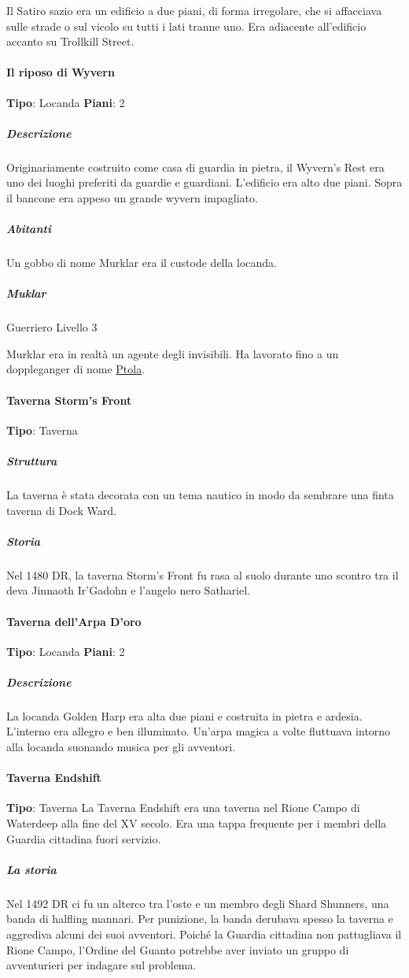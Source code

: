 \documentclass{article}
\begin{document}
Il Satiro sazio era un edificio a due piani, di forma irregolare, che si affacciava sulle strade o sul vicolo su tutti i lati tranne uno. Era adiacente all'edificio accanto su Trollkill Street.
\paragraph{Il riposo di Wyvern}
\textbf{Tipo}: Locanda
\textbf{Piani}: 2 \newline
\subparagraph{Descrizione}
Originariamente costruito come casa di guardia in pietra, il Wyvern's Rest era uno dei luoghi preferiti da guardie e guardiani. L'edificio era alto due piani. Sopra il bancone era appeso un grande wyvern impagliato.

\subparagraph{Abitanti}
Un gobbo di nome Murklar era il custode della locanda.
\subparagraph{Muklar}
Guerriero Livello 3 \newline

Murklar era in realtà un agente degli invisibili. Ha lavorato fino a un doppleganger di nome \hyperlink{https://forgottenrealms.fandom.com/wiki/Ptola}{Ptola}.
\paragraph{Taverna Storm's Front}
\textbf{Tipo}: Taverna
\subparagraph{Struttura}
La taverna è stata decorata con un tema nautico in modo da sembrare una finta taverna di Dock Ward.

\subparagraph{Storia}
Nel 1480 DR, la taverna Storm's Front fu rasa al suolo durante uno scontro tra il deva Jinnaoth Ir'Gadohn e l'angelo nero Sathariel.

\paragraph{Taverna dell'Arpa D'oro}
\textbf{Tipo}: Locanda
\textbf{Piani}: 2
\subparagraph{Descrizione}
La locanda Golden Harp era alta due piani e costruita in pietra e ardesia. L'interno era allegro e ben illuminato. Un'arpa magica a volte fluttuava intorno alla locanda suonando musica per gli avventori.
\paragraph{Taverna Endshift}
\textbf{Tipo}: Taverna
La Taverna Endshift era una taverna nel Rione Campo di Waterdeep alla fine del XV secolo. Era una tappa frequente per i membri della Guardia cittadina fuori servizio.

\subparagraph{La storia}
Nel 1492 DR ci fu un alterco tra l'oste e un membro degli Shard Shunners, una banda di halfling mannari. Per punizione, la banda derubava spesso la taverna e aggrediva alcuni dei suoi avventori. Poiché la Guardia cittadina non pattugliava il Rione Campo, l'Ordine del Guanto potrebbe aver inviato un gruppo di avventurieri per indagare sul problema.
\end{document}
